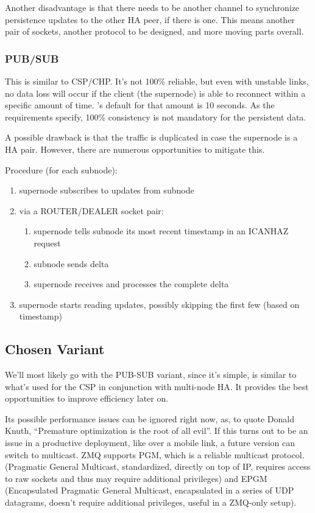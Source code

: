 Another disadvantage is that there needs to be another channel to synchronize
persistence updates to the other HA peer, if there is one. This means another
pair of sockets, another protocol to be designed, and more moving parts
overall.

\subsubsection{PUB/SUB}
This is similar to CSP/CHP. It's not 100\% reliable, but even with unstable
links, no data loss will occur if the client (the supernode) is able to reconnect within a
specific amount of time. \zmq's default for that amount is 10 seconds. As the
requirements specify, 100\% consistency is not mandatory for the persistent
data.

A possible drawback is that the traffic is duplicated in case the supernode
is a HA pair. However, there are numerous opportunities to mitigate this.

Procedure (for each subnode):
\begin{enumerate}
	\item supernode subscribes to updates from subnode
	\item via a ROUTER/DEALER socket pair:
		\begin{enumerate}
			\item supernode tells subnode its most recent timestamp in an ICANHAZ request
			\item subnode sends delta
			\item supernode receives and processes the complete delta
		\end{enumerate}
	\item supernode starts reading updates, possibly skipping the first few (based on timestamp)
\end{enumerate}

\subsection{Chosen Variant}
We'll most likely go with the PUB-SUB variant, since it's simple, is similar to
what's used for the CSP in conjunction with multi-node HA. It provides the best
opportunities to improve efficiency later on.

Its possible performance issues can be ignored right now, as, to quote Donald
Knuth, ``Premature optimization is the root of all evil''. If this turns out to
be an issue in a productive deployment, like over a mobile link, a future
version can switch to multicast. ZMQ supports PGM, which is a reliable
multicast protocol. (Pragmatic General Multicast, standardized, directly on top
of IP, requires access to raw sockets and thus may require additional
privileges) and EPGM (Encapsulated Pragmatic General Multicast, encapsulated in
a series of UDP datagrams, doesn't require additional privileges, useful in a
ZMQ-only setup).


